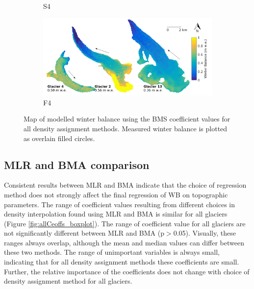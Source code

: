 \documentclass{sfuthesis}
\begin{document}
\begin{figure}
\begin{subfigure}[b]{0.475\textwidth}
            \caption[]%
            {{\small S4}}    
        \end{subfigure}
        \quad
        \begin{subfigure}[b]{0.475\textwidth}   
            \centering 
            \includegraphics[width=\textwidth]{BMSmap_Modelled_Observed8.png}
            \caption[]%
            {{\small F4}}    
        \end{subfigure}
              
        \caption[Map of modelled winter balance using the BMS coefficient values for all density assignment methods. Measured winter balance is plotted as overlain filled circles.]
        {\small Map of modelled winter balance using the BMS coefficient values for all density assignment methods. Measured winter balance is plotted as overlain filled circles.} 
        \label{fig:allBMSmodelled}
    \end{figure}




\subsection{MLR and BMA comparison}


Consistent results between MLR and BMA indicate that the choice of regression method does not strongly affect the final regression of WB on topographic parameters. The range of coefficient values resulting from different choices in density interpolation found using MLR and BMA is similar for all glaciers (Figure \ref{fig:allCeoffs_boxplot}). The range of coefficient value for all glaciers are not significantly different between MLR and BMA (p$>$0.05). Visually, these ranges always overlap, although the mean and median values can differ between these two methods. The range of unimportant variables is always small, indicating that for all density assignment methods these coefficients are small. Further, the relative importance of the coefficients does not change with choice of density assignment method for all glaciers. 
\end{document}
